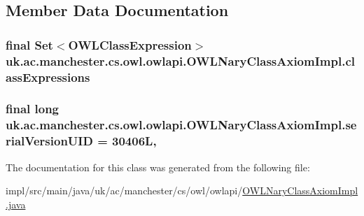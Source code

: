 \subsection{Member Data Documentation}
\hypertarget{classuk_1_1ac_1_1manchester_1_1cs_1_1owl_1_1owlapi_1_1_o_w_l_nary_class_axiom_impl_a1f49ad91a00e2548f99a93ca8de82f7c}{
\subsubsection[{class\-Expressions}]{\setlength{\rightskip}{0pt plus 5cm}final Set$<${\bf O\-W\-L\-Class\-Expression}$>$ uk.\-ac.\-manchester.\-cs.\-owl.\-owlapi.\-O\-W\-L\-Nary\-Class\-Axiom\-Impl.\-class\-Expressions\hspace{0.3cm}{\ttfamily [private]}}}\label{classuk_1_1ac_1_1manchester_1_1cs_1_1owl_1_1owlapi_1_1_o_w_l_nary_class_axiom_impl_a1f49ad91a00e2548f99a93ca8de82f7c}
\hypertarget{classuk_1_1ac_1_1manchester_1_1cs_1_1owl_1_1owlapi_1_1_o_w_l_nary_class_axiom_impl_a7b3ccb84867078585bcdde918db3d55b}{
\subsubsection[{serial\-Version\-U\-I\-D}]{\setlength{\rightskip}{0pt plus 5cm}final long uk.\-ac.\-manchester.\-cs.\-owl.\-owlapi.\-O\-W\-L\-Nary\-Class\-Axiom\-Impl.\-serial\-Version\-U\-I\-D = 30406\-L\hspace{0.3cm}{\ttfamily [static]}, {\ttfamily [private]}}}\label{classuk_1_1ac_1_1manchester_1_1cs_1_1owl_1_1owlapi_1_1_o_w_l_nary_class_axiom_impl_a7b3ccb84867078585bcdde918db3d55b}


The documentation for this class was generated from the following file\-:\begin{DoxyCompactItemize}
\item 
impl/src/main/java/uk/ac/manchester/cs/owl/owlapi/\hyperlink{_o_w_l_nary_class_axiom_impl_8java}{O\-W\-L\-Nary\-Class\-Axiom\-Impl.\-java}\end{DoxyCompactItemize}
